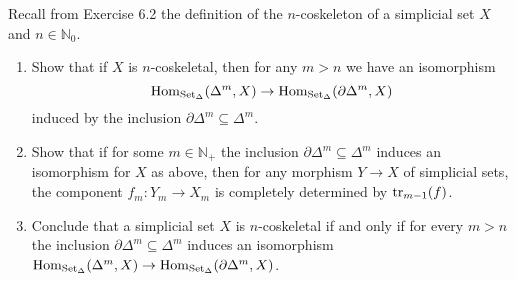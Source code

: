 \begin{Exercise}
    Recall from Exercise 6.2 the definition of the $n$-coskeleton of a simplicial set $ X $ and $ n \in \mathbb{N}_0 $.
    
    \begin{enumerate}[label=(\alph*)]
        \item 
        Show that if $ X $ is $n$-coskeletal, then for any $ m > n $ we have an isomorphism
        \[
            \operatorname{Hom}_{\operatorname{Set}_{\Delta}}( \Delta^m , X ) 
            \to 
            \operatorname{Hom}_{\operatorname{Set}_{\Delta}} ( \partial \Delta^m , X ) 
        \]
        induced by the inclusion $ \partial \Delta^m \subseteq \Delta^m$.
    
        \item 
        Show that if for some $ m \in \mathbb{N}_+$ the inclusion $ \partial \Delta^m \subseteq \Delta^m $ induces an isomorphism for $ X $ as above, then for any morphism $ Y \to X $ of simplicial sets, the component $ f_m \colon Y_m \to X_m $ is completely determined by $ \operatorname{tr}_{m-1} ( f ) $.
    
        \item 
        Conclude that a simplicial set $ X $ is $ n $-coskeletal if and only if for every $ m > n $ the inclusion $ \partial \Delta^m \subseteq \Delta^m $ induces an isomorphism $ \operatorname{Hom}_{ \operatorname{Set}_{\Delta} } ( \Delta^m , X ) \to \operatorname{Hom}_{\operatorname{Set}_{\Delta}} ( \partial \Delta^m , X )$.
        
    \end{enumerate}
\end{Exercise}
